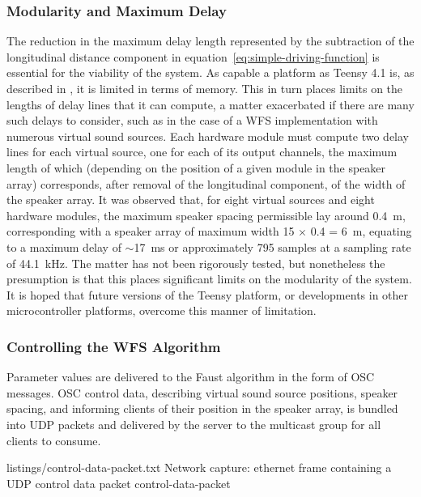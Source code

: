 \subsubsection{Modularity and Maximum Delay}

The reduction in the maximum delay length represented by the subtraction of
the longitudinal distance component in
equation~\eqref{eq:simple-driving-function} is essential for the viability of
the system.
As capable a platform as Teensy 4.1 is, as described in
, it is limited in terms of memory.
This in turn places limits on the lengths of delay lines that it can compute,
a matter exacerbated if there are many such delays to consider, such as in the
case of a WFS implementation with numerous virtual sound sources.
Each hardware module must compute two delay lines for each virtual source, one
for each of its output channels, the maximum length of which (depending on
the position of a given module in the speaker array) corresponds, after removal
of the longitudinal component, of the width of the speaker array.
It was observed that, for eight virtual sources and eight hardware modules,
the maximum speaker spacing permissible lay around \qty{.4}{\m},
corresponding with a speaker array of maximum width 15 $\times$ 0.4 =
\qty{6}{\m}, equating to a maximum delay of $\sim$\qty{17}{\ms} or
approximately 795 samples at a sampling rate of \qty{44.1}{\kHz}.
The matter has not been rigorously tested, but nonetheless the presumption is
that this places significant limits on the modularity of the system.
It is hoped that future versions of the Teensy platform, or developments in
other microcontroller platforms, overcome this manner of limitation.

\subsubsection{Controlling the WFS Algorithm}

Parameter values are delivered to the Faust algorithm in the form of OSC
messages.
OSC control data, describing virtual sound source positions, speaker spacing,
and informing clients of their position in the speaker array, is bundled into
UDP packets and delivered by the server to the multicast group for all clients
to consume.

{listings/control-data-packet.txt}
{Network capture: ethernet frame containing a UDP control data packet}
{control-data-packet}

